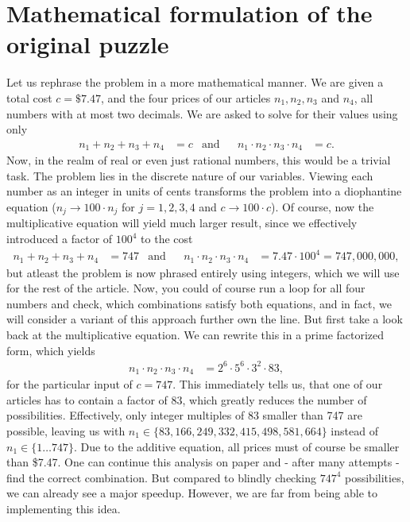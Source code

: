 \documentclass[english, parskip=full]{scrartcl}
\newcommand{\tecxt}{}
\begin{document}
\section{Mathematical formulation of the original puzzle}
Let us rephrase the problem in a more mathematical manner. We are given a total cost $c=\tecxt\text{\$}7.47$, and the four prices of our articles $n_1,n_2,n_3$ and $n_4$, all numbers with at most two decimals. We are asked to solve for their values using only
\begin{align*}
n_1+n_2+n_3+n_4&=c&\tecxt\text{and}&&n_1\cdot n_2\cdot n_3\cdot n_4&=c.
\end{align*}
Now, in the realm of real or even just rational numbers, this would be a trivial task. The problem lies in the discrete nature of our variables. Viewing each number as an integer in units of cents transforms the problem into a diophantine equation ($n_j\rightarrow 100\cdot n_j$ for $j=1,2,3,4$ and $c\rightarrow 100\cdot c$). Of course, now the multiplicative equation will yield much larger result, since we effectively introduced a factor of $100^4$ to the cost
\begin{align*}
n_1+n_2+n_3+n_4&=747&\tecxt\text{and}&&n_1\cdot n_2\cdot n_3\cdot n_4&=7.47\cdot 100^4=747,000,000,
\end{align*}
but atleast the problem is now phrased entirely using integers, which we will use for the rest of the article. Now, you could of course run a loop for all four numbers and check, which combinations satisfy both equations, and in fact, we will consider a variant of this approach further own the line. But first take a look back at the multiplicative equation. We can rewrite this in a prime factorized form, which yields
\begin{align*}
n_1\cdot n_2\cdot n_3\cdot n_4&=2^6\cdot 5^6\cdot 3^2\cdot 83,
\end{align*}
for the particular input of $c=747$. This immediately tells us, that one of our articles has to contain a factor of 83, which greatly reduces the number of possibilities. Effectively, only integer multiples of 83 smaller than 747 are possible, leaving us with $n_1\in\{83, 166, 249, 332, 415, 498, 581, 664\}$ instead of $n_1\in\{1\dots 747\}$. Due to the additive equation, all prices must of course be smaller than \$7.47. One can continue this analysis on paper and - after many attempts - find the correct combination. But compared to blindly checking $747^4$ possibilities, we can already see a major speedup. However, we are far from being able to implementing this idea.
\end{document}
